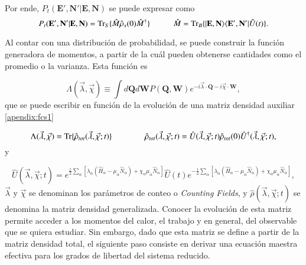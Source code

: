 Por ende, $P_{t}(\textbf{E}',\textbf{N}'|\textbf{E},\textbf{N})$ se puede expresar como
\begin{equation*}
    P_{t}(\textbf{E}',\textbf{N}'|\textbf{E},\textbf{N}) = \text{Tr}_{S}\{\hat{M} \hat{\rho}_{s}(0)\hat{M}^{\dagger} \}  \hspace{10mm} \hat{M} = \text{Tr}_{B}\{|\textbf{E},\textbf{N} \rangle \langle \textbf{E}',\textbf{N}' | \hat{U}(t)\}.
\end{equation*}

Al contar con una distribución de probabilidad, se puede construir la función generadora de momentos, a partir de la cuál pueden obtenerse cantidades como el promedio o la varianza. Esta función es

\begin{equation}
    \Lambda(\vec{\lambda},\vec{\chi}) \equiv \int d\textbf{Q} d\textbf{W}P(\textbf{Q},\textbf{W}) e^{-i\vec{\lambda}\cdot \textbf{Q} -i\vec{\chi}\cdot \textbf{W} },
\label{sec2funciongeneradora}
\end{equation}
que se puede escribir en función de la evolución de una matriz densidad auxiliar \ref{apendix:fcs1}

\begin{equation}
    \Lambda(\vec{\lambda},\vec{\chi}) = \text{Tr}\{\hat{\rho}_{tot}(\vec{\lambda},\vec{\chi};t) \}    \hspace{14mm} \hat{\rho}_{tot}(\vec{\lambda},\vec{\chi};t) = \hat{U}(\vec{\lambda},\vec{\chi};t) \hat{\rho}_{tot}(0) \hat{U}^{\dagger}(\vec{\lambda},\vec{\chi};t),
    \label{sec2:evolucionconteo}
\end{equation}
y 

\begin{equation*}
    \hat{U}(\vec{\lambda},\vec{\chi};t) = e^{\frac{i}{2}\sum_{\alpha}[\lambda_{\alpha}(\hat{H}_{\alpha} - \mu_{\alpha}\hat{N}_{\alpha} ) + \chi_{\alpha}\mu_{\alpha}\hat{N}_{\alpha} ]  } \hat{U}(t) e^{-\frac{i}{2}\sum_{\alpha}[ \lambda_{\alpha}(\hat{H}_{\alpha} - \mu_{\alpha}\hat{N}_{\alpha}) + \chi_{\alpha}\mu_{\alpha}\hat{N}_{\alpha} ]},
\end{equation*}
$\vec{\lambda}$ y $\vec{\chi}$ se denominan los parámetros de conteo o \textit{Counting Fields}, y $\hat{\rho}(\vec{\lambda},\vec{\chi};t)$ se denomina la matriz densidad generalizada. Conocer la evolución de esta matriz permite acceder a los momentos del calor, el trabajo y en general, del observable que se quiera estudiar. Sin embargo, dado que esta matriz se define a partir de la matriz densidad total, el siguiente paso consiste en derivar una ecuación maestra efectiva para los grados de libertad del sistema reducido.

